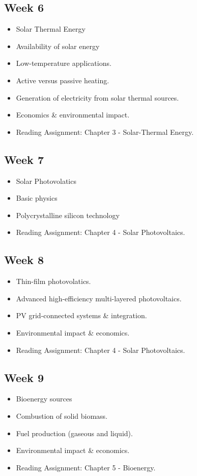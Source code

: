 \documentclass[11pt]{article}
\begin{document}
	\subsection*{Week 6}
	\begin{itemize}
            \item Solar Thermal Energy
            \item Availability of solar energy
            \item Low-temperature applications.
            \item Active versus passive heating.
            \item Generation of electricity from solar thermal sources.
            \item Economics \& environmental impact.
            \item Reading Assignment: Chapter 3 - Solar-Thermal Energy.
	    \end{itemize}
	\subsection*{Week 7}
	\begin{itemize}
        \item Solar Photovolatics
        \item Basic physics
        \item Polycrystalline silicon technology 
         \item Reading Assignment: Chapter 4 - Solar Photovoltaics.
	\end{itemize}

\subsection*{Week 8}
	\begin{itemize}
        \item Thin-film photovolatics.
        \item Advanced high-efficiency multi-layered photovoltaics.
	    \item PV grid-connected systems \& integration.
	    \item Environmental impact \& economics.
	    \item Reading Assignment: Chapter 4 - Solar Photovoltaics.
     \end{itemize}
		\subsection*{Week 9}
	\begin{itemize}
	  \item Bioenergy sources
	    \item Combustion of solid biomass.
	    \item Fuel production (gaseous and liquid).
	    \item Environmental impact \& economics.
	    \item Reading Assignment: Chapter 5 - Bioenergy.
	\end{itemize}
\end{document}
